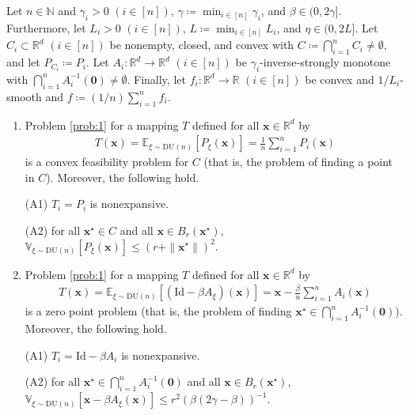 \documentclass[smallextended,referee,envcountsect,]{svjour3}
\begin{document}
\begin{example}\label{exp:1}
Let $n \in \mathbb{N}$ and $\gamma_i > 0$ $(i\in [n])$, $\gamma \coloneqq \min_{i\in [n]} \gamma_i$, and $\beta \in (0,2 \gamma]$. Furthermore, let $L_i > 0$ $(i\in [n])$, $L \coloneqq \min_{i\in [n]} L_i$, and $\eta \in (0,2L]$. Let $C_i \subset \mathbb{R}^d$ $(i\in [n])$ be nonempty, closed, and convex with $C \coloneqq \bigcap_{i=1}^n C_i \neq \emptyset$, and let $P_{C_i} \coloneqq P_i$. Let $A_i \colon \mathbb{R}^d \to \mathbb{R}^d$ $(i\in [n])$ be $\gamma_i$-inverse-strongly monotone with $\bigcap_{i=1}^n A_i^{-1}(\bm{0}) \neq \emptyset$. Finally, let $f_i \colon \mathbb{R}^d \to \mathbb{R}$ $(i\in [n])$ be convex and $1/L_i$-smooth and $f \coloneqq (1/n) \sum_{i=1}^n f_i$.
\begin{enumerate}
\item[(i)] [Convex feasibility problem] Problem \ref{prob:1} for a mapping $T$ defined for all $\bm{x} \in \mathbb{R}^d$ by
\begin{align}\label{cfp_t}
T (\bm{x})
= 
\mathbb{E}_{\xi \sim \mathrm{DU}(n)} [P_\xi (\bm{x})]
= \frac{1}{n} \sum_{i=1}^n P_i (\bm{x})
\end{align}
is a convex feasibility problem for $C$ (that is, the problem of finding a point in $C$). Moreover, the following hold.

{(A1)} $T_i = P_i$ is nonexpansive.

{(A2)} for all $\bm{x}^\star \in C$ and all $\bm{x} \in B_{r}(\bm{x}^\star)$, $\mathbb{V}_{\xi \sim \mathrm{DU}(n)}[P_\xi (\bm{x})] \leq (r + \|\bm{x}^\star\|)^2$.

\item[(ii)] [Zero point problem] Problem \ref{prob:1} for a mapping $T$ defined for all $\bm{x} \in \mathbb{R}^d$ by
\begin{align}\label{zero_t}
T (\bm{x})
= 
\mathbb{E}_{\xi \sim \mathrm{DU}(n)} [(\mathrm{Id} - \beta A_\xi) (\bm{x})]
= \bm{x} - \frac{\beta}{n} \sum_{i=1}^n A_i (\bm{x})
\end{align}
is a zero point problem (that is, the problem of finding $\bm{x}^\star \in \bigcap_{i=1}^n A_i^{-1}(\bm{0})$). Moreover, the following hold.

{(A1)} $T_i = \mathrm{Id} - \beta A_i$ is nonexpansive.

{(A2)} for all $\bm{x}^\star \in \bigcap_{i=1}^n A_i^{-1}(\bm{0})$ and all $\bm{x} \in B_{r}(\bm{x}^\star)$, $\mathbb{V}_{\xi \sim \mathrm{DU}(n)}[\bm{x} - \beta A_\xi (\bm{x})] \leq r^2 (\beta (2 \gamma - \beta))^{-1}$. 


\end{enumerate}
\end{example}
\end{document}
